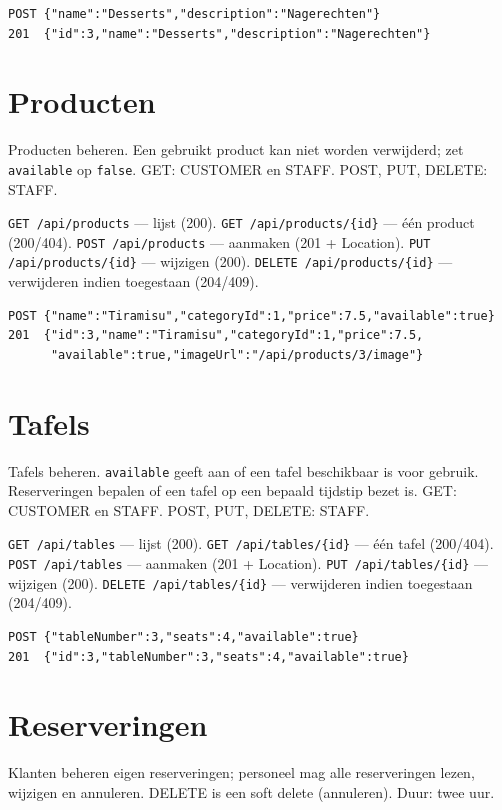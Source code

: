 \documentclass[11pt]{article}
\begin{document}
\begin{lstlisting}
POST {"name":"Desserts","description":"Nagerechten"}
201  {"id":3,"name":"Desserts","description":"Nagerechten"}
\end{lstlisting}

\section{Producten}
Producten beheren. Een gebruikt product kan niet worden verwijderd; zet
\texttt{available} op \texttt{false}. GET: CUSTOMER en STAFF. POST, PUT,
DELETE: STAFF.

\texttt{GET /api/products} --- lijst (200).
\texttt{GET /api/products/\{id\}} --- één product (200/404).
\texttt{POST /api/products} --- aanmaken (201 + Location).
\texttt{PUT /api/products/\{id\}} --- wijzigen (200).
\texttt{DELETE /api/products/\{id\}} --- verwijderen indien toegestaan (204/409).

\begin{lstlisting}
POST {"name":"Tiramisu","categoryId":1,"price":7.5,"available":true}
201  {"id":3,"name":"Tiramisu","categoryId":1,"price":7.5,
      "available":true,"imageUrl":"/api/products/3/image"}
\end{lstlisting}

\section{Tafels}
Tafels beheren. \texttt{available} geeft aan of een tafel beschikbaar is voor
gebruik. Reserveringen bepalen of een tafel op een bepaald tijdstip bezet is.
GET: CUSTOMER en STAFF. POST, PUT, DELETE: STAFF.

\texttt{GET /api/tables} --- lijst (200).
\texttt{GET /api/tables/\{id\}} --- één tafel (200/404).
\texttt{POST /api/tables} --- aanmaken (201 + Location).
\texttt{PUT /api/tables/\{id\}} --- wijzigen (200).
\texttt{DELETE /api/tables/\{id\}} --- verwijderen indien toegestaan (204/409).

\begin{lstlisting}
POST {"tableNumber":3,"seats":4,"available":true}
201  {"id":3,"tableNumber":3,"seats":4,"available":true}
\end{lstlisting}

\section{Reserveringen}
Klanten beheren eigen reserveringen; personeel mag alle reserveringen lezen,
wijzigen en annuleren. DELETE is een soft delete (annuleren). Duur: twee uur.
\end{document}
